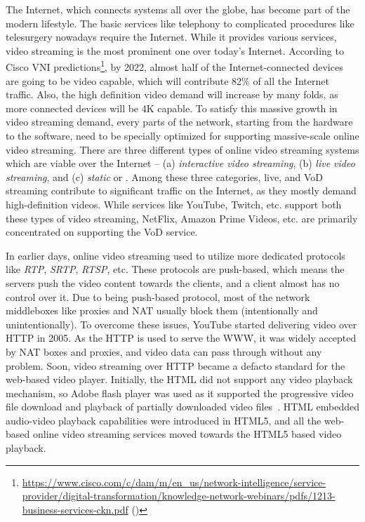 The Internet, which connects systems all over the globe, has become part of the modern lifestyle. The basic services like telephony to complicated procedures like telesurgery nowadays require the Internet. While it provides various services, video streaming is the most prominent one over today's Internet. According to Cisco \ac{VNI} predictions\footnote{\url{https://www.cisco.com/c/dam/m/en_us/network-intelligence/service-provider/digital-transformation/knowledge-network-webinars/pdfs/1213-business-services-ckn.pdf} (\lastaccessedtoday)}, by 2022, almost half of the Internet-connected devices are going to be video capable, which will contribute 82\% of all the Internet traffic. Also, the high definition video demand will increase by many folds, as more connected devices will be 4K capable. To satisfy this massive growth in video streaming demand, every parts of the network, starting from the hardware to the software, need to be specially optimized for supporting massive-scale online video streaming. There are three different types of online video streaming systems which are viable over the Internet -- (a) \textit{interactive video streaming}, (b) \textit{live video streaming}, and (c) \textit{static} or . Among these three categories, live, and \ac{VoD} streaming contribute to significant traffic on the Internet, as they mostly demand high-definition videos. While services like YouTube, Twitch, etc. support both these types of video streaming, NetFlix, Amazon Prime Videos, etc. are primarily concentrated on supporting the \ac{VoD} service. 

In earlier days, online video streaming used to utilize more dedicated protocols like \textit{\ac{RTP}}, \textit{\ac{SRTP}}, \textit{\ac{RTSP}}, etc. These protocols are push-based, which means the servers push the video content towards the clients, and a client almost has no control over it. Due to being push-based protocol, most of the network middleboxes like proxies and \ac{NAT} usually block them (intentionally and unintentionally). To overcome these issues, YouTube started delivering video over \ac{HTTP} in 2005. As the \ac{HTTP} is used to serve the \ac{WWW}, it was widely accepted by \ac{NAT} boxes and proxies, and video data can pass through without any problem. Soon, video streaming over \ac{HTTP} became a defacto standard for the web-based video player. Initially, the \ac{HTML} did not support any video playback mechanism, so Adobe flash player was used as it supported the progressive video file download and playback of partially downloaded video files~\cite{gill2007youtube}. \ac{HTML} embedded audio-video playback capabilities were introduced in \ac{HTML5}, and all the web-based online video streaming services moved towards the \ac{HTML5} based video playback.

